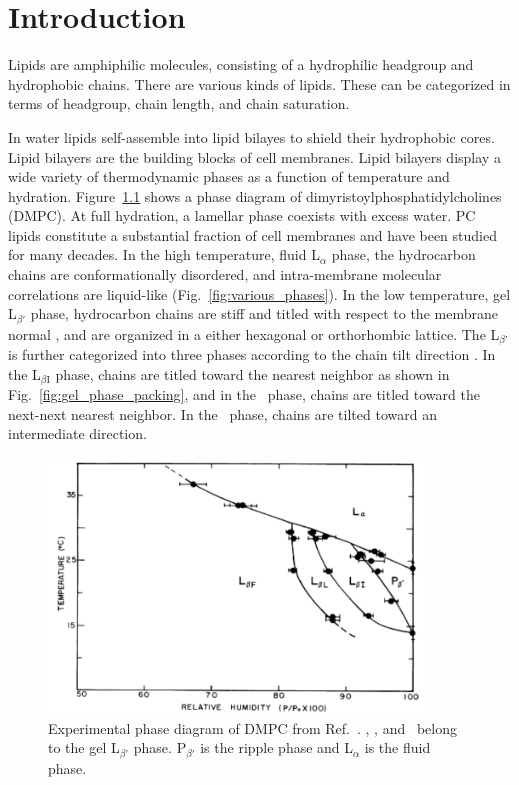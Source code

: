 \chapter{Introduction}
Lipids are amphiphilic molecules, consisting of a hydrophilic headgroup
and hydrophobic chains. There are various kinds of lipids. These can be 
categorized in terms of headgroup, chain length, and chain saturation.

In water lipids self-assemble into lipid bilayes to shield their hydrophobic 
cores. Lipid bilayers are the building blocks of cell membranes. Lipid bilayers 
display a wide variety of thermodynamic phases
as a function of temperature and hydration. Figure~\ref{fig:phase_diagram}
shows a phase diagram of dimyristoylphosphatidylcholines (DMPC).
At full hydration, a lamellar phase coexists with excess water.
PC lipids constitute a substantial fraction of cell membranes
and have been studied for many decades.
In the high temperature, fluid L$_\alpha$ phase, the hydrocarbon chains 
are conformationally disordered, and intra-membrane molecular correlations 
are liquid-like \cite{ref:Fahey78} (Fig.~\ref{fig:various_phases}).
In the low temperature, gel L$_{\beta'}$
phase, hydrocarbon chains are stiff and titled with respect to the membrane
normal \cite{ref:Tardieu73}, and are organized in a either hexagonal 
or orthorhombic lattice. 
The L$_{\beta'}$ is further categorized into three phases according to the 
chain tilt direction \cite{ref:Smith88}. 
In the L$_{\beta\text{I}}$ phase, chains are titled toward the 
nearest neighbor as shown in Fig.~\ref{fig:gel_phase_packing}, and
in the \LbetaF\ phase, chains are titled toward the next-next nearest neighbor.
In the \LbetaL\ phase, chains are tilted toward an intermediate direction.

\begin{figure}[htbp]
  \centering
  \includegraphics[width=0.9\textwidth]{figures/ripple/smith_phase_diagram}
  \caption{Experimental phase diagram of DMPC from Ref.~\cite{ref:Smith88}.
  \LbetaI, \LbetaL, and \LbetaF\ belong to the gel L$_{\beta'}$ phase. P$_{\beta'}$ is 
  the ripple phase and L$_\alpha$ is the fluid phase.}
  \label{fig:phase_diagram}
\end{figure}

